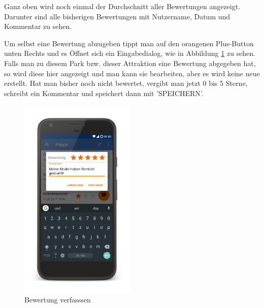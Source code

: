 Ganz oben wird noch einmal der Durchschnitt aller Bewertungen angezeigt. Darunter sind alle bisherigen Bewertungen mit Nutzername, Datum und Kommentar zu sehen.

Um selbst eine Bewertung abzugeben tippt man auf den orangenen Plus-Button unten Rechts und es Öffnet sich ein Eingabedialog, wie in Abbildung \ref{figure:implementierungbewerten} zu sehen. Falls man zu diesem Park bzw. dieser Attraktion eine Bewertung abgegeben hat, so wird diese hier angezeigt und man kann sie bearbeiten, aber es wird keine neue erstellt. Hat man bisher noch nicht bewertet, vergibt man jetzt 0 bis 5 Sterne, schreibt ein Kommentar und speichert dann mit 'SPEICHERN'.

\begin{figure}[h]
    \centering
    \begin{minipage}{0.49\textwidth}
        \centering
        \includegraphics[width=0.49\textwidth, trim=150 200 200 200, 
        clip]{img/screenshots/ss_bewertung_edit.png}
        \caption{Bewertung verfasssen}
		\label{figure:implementierungbewerten}
    \end{minipage}
    \begin{minipage}{0.49\textwidth}
        \centering

\end{minipage}
\end{figure}
